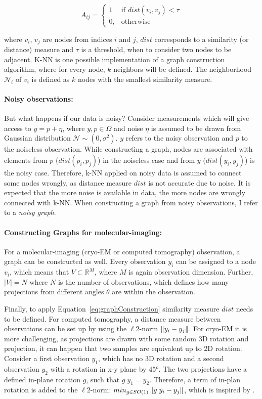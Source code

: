 \begin{equation}
    \label{eq:graphConstruction}
    A_{ij} =    
    \begin{cases}
        1  & \text{if } dist(v_i, v_j) < \tau\\
        0, & \text{otherwise}
    \end{cases}
\end{equation}

where $v_i$, $v_j$ are nodes from indices $i$ and $j$, $dist$ corresponds to a similarity (or distance) measure and $\tau$ is a threshold, 
when to consider two nodes to be adjacent.
K-NN is one possible implementation of a graph construction algorithm, 
where for every node, $k$ neighbors will be defined.
The neighborhood $\mathcal{N}_i$ of $v_i$ is defined as $k$ nodes with the smallest similarity measure.

\paragraph{Noisy observations:}
But what happens if our data is noisy?
Consider measurements which will give access to $y = p + \eta$, where $y,p \in \Omega$ and noise $\eta$ is assumed to be drawn from Gaussian distribution $\mathcal{N} \sim (0,\sigma^2)$.
$y$ refers to the noisy observation and $p$ to the noiseless observation.
While constructing a graph, nodes are associated with elements from $p$ ($dist(p_i, p_j)$) in the noiseless case and from $y$ ($dist(y_i, y_j)$) is the noisy case.
Therefore, k-NN applied on noisy data is assumed to connect some nodes wrongly, as distance measure $dist$
is not accurate due to noise. It is expected that the more noise is available in data, the more nodes are wrongly connected with k-NN.
When constructing a graph from noisy observations, I refer to a \textit{noisy graph}.

\paragraph{Constructing Graphs for molecular-imaging:}
For a molecular-imaging (cryo-EM or computed tomography) observation, a graph can be constructed as well.
Every observation $y_i$ can be assigned to a node $v_i$, which means that $V \subset \mathbb{R}^M$, where 
$M$ is again observation dimension. 
Further, $|V|=N$ where $N$ is the number of observations, which defines how many projections from different
angles $\theta$ are within the observation.

Finally, to apply Equation~\ref{eq:graphConstruction} similarity measure $dist$ needs to be defined.
For computed tomography, a distance measure between observations can be set up by using the $\ell2$-norm $\left\lVert y_i - y_j\right\rVert$.
For cryo-EM it is more challenging, as projections are drawn with some random 3D rotation and projection, 
it can happen that two samples are equivalent up to 2D rotation. 
Consider a first observation $y_1$, which has no 3D rotation and 
a second observation $y_2$ with a rotation in x-y plane by 45°.
The two projections have a defined in-plane rotation $g$, such that $g \; y_1 = y_2$.
Therefore, a term of in-plan rotation is added to the $\ell2$-norm: $min_{g \in SO(1)}\left\lVert g \;y_i - y_j\right\rVert$, 
which is inspired by \cite{multiDiffusionMaps}. 


